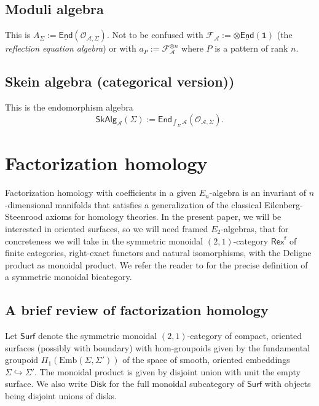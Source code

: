 \documentclass[11pt]{article}
\newcommand{\cA}{\mathcal{A}}
\theoremstyle{definition}
\begin{document}
\subsection{Moduli algebra}


This is $A_\Sigma := \underline{\mathsf{End}}(\mathcal{O}_{\mathcal{A}, \Sigma})$. Not to be confused with $\mathcal{F}_{\mathcal{A}} := \otimes\underline{\mathsf{End}}(\mathbf{1})$ (the \textit{reflection equation algebra}) or with $a_P := \mathcal{F}_{\mathcal{A}} ^{\otimes n}$ where $P$ is a pattern of rank $n$.


\subsection{Skein algebra (categorical version))}

This is the endomorphism algebra $$  \mathsf{SkAlg}_\cA (\Sigma):= \mathsf{End}_{\int_{\Sigma} \cA} (\mathcal{O}_{\mathcal{A}, \Sigma}). $$







	




\section{Factorization homology}	



Factorization homology \cite{higheralgebra,AF} with coefficients in a given $E_n$-algebra is an invariant of $n$-dimensional manifolds that satisfies a generalization of the classical Eilenberg-Steenrood axioms for homology theories. In the present paper, we will be interested in oriented surfaces, so we will need framed $E_2$-algebras, that for concreteness we will take in the symmetric monoidal $(2,1)$-category $\mathsf{Rex}^\mathsf{f}$ of finite categories, right-exact functors and natural isomorphisms, with the Deligne product as monoidal product. We refer the reader to \cite[Chapter 2]{schommerpries} for the precise definition of a symmetric monoidal bicategory.



\subsection{A brief review of factorization homology}\label{subsec:review_FH}



Let $\mathsf{Surf}$ denote the symmetric monoidal $(2,1)$-category of compact, oriented surfaces (possibly with boundary) with hom-groupoids given by the fundamental groupoid $\Pi_1(\mathrm{Emb}(\Sigma, \Sigma'))$ of the space of smooth, oriented embeddings $\Sigma \hookrightarrow \Sigma'$. The monoidal product is given by disjoint union with unit the empty surface. We also write $\mathsf{Disk}$ for the full monoidal subcategory of $\mathsf{Surf}$ with objects being disjoint unions of disks.
\end{document}
